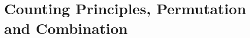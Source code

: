 \documentclass[../../main.tex]{subfiles}
\begin{document}
\chapter{Counting Principles, Permutation and Combination}
\end{document}
